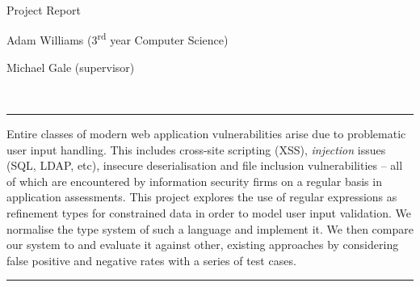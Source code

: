 \documentclass[a4paper,openany,12pt]{book}
\begin{document}
\begin{titlepage}
{}
    
    {\par}
    \vspace{1.25cm}
    \vspace{3.5cm}
    {\hspace{0.75cm}\Huge \warwickfont Project Report}
    \vspace{0.16cm}
    {\par}
    {\hspace{0.75cm}\large \warwickfont Adam Williams (3\textsuperscript{rd} year Computer Science)}


    {\hspace{0.75cm}\large \warwickfont Michael Gale (supervisor)}
    \vfill
\end{titlepage}
\restoregeometry
\restorepagecolor

\pagebreak[5]
\newenvironment{abstract}{\centering{\normalfont\Large\sffamily\color{id7-aubergine}Abstract}\vspace{0.3cm}\\
	\hfill\begin{minipage}{0.95\textwidth}
		\rule{\textwidth}{1pt}}
	{\par\noindent\rule{\textwidth}{1pt}\end{minipage}}

\begin{abstract}
	Entire classes of modern web application vulnerabilities arise due to problematic user input handling. This includes cross-site scripting (XSS), \emph{injection} issues (SQL, LDAP, etc), insecure
	deserialisation and file inclusion vulnerabilities – all of which are encountered by information
	security firms on a regular basis in application assessments. This project explores the use of regular expressions as refinement types for constrained data in order to model user input validation. We
	normalise the type system of such a language and implement it. We then compare our system to and evaluate it against other, existing approaches by considering false positive and negative rates with a
	series of test cases. 
\end{abstract}
\end{document}
